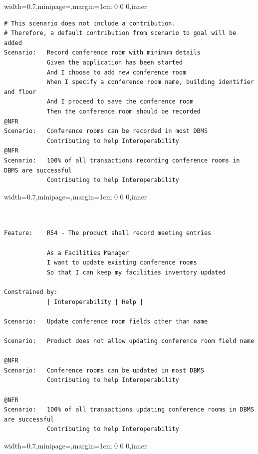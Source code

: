 \documentclass[dissertation,final]{softeng}
\newenvironment{featurecode}[1]
{ \lrbox\featurebox \begin{adjustbox}{width=#1\textwidth,minipage=\textwidth,margin=1cm 0 0 0,inner} }
{ \end{adjustbox}\endlrbox}
\newenvironment{featurelist}[2]
{
\newcommand{\setcaption}{\caption{#1}}
\newcommand{\setlabel}{\label{#2}}
}
{\begin{listing}[h!]\centering\usebox\featurebox\setcaption\setlabel\end{listing}}
\begin{document}
\begin{appendices}
\begin{featurelist}{R53 -- The product shall store new conference rooms}{lst:feature_r53}
\begin{featurecode}{0.7}
\begin{verbatim}
# This scenario does not include a contribution.
# Therefore, a default contribution from scenario to goal will be added
Scenario:   Record conference room with minimum details
            Given the application has been started
            And I choose to add new conference room
            When I specify a conference room name, building identifier and floor
            And I proceed to save the conference room
            Then the conference room should be recorded
@NFR	
Scenario:   Conference rooms can be recorded in most DBMS
            Contributing to help Interoperability
@NFR
Scenario:   100% of all transactions recording conference rooms in DBMS are successful
            Contributing to help Interoperability
\end{verbatim}
\end{featurecode}
\end{featurelist}

\begin{featurelist}{R54 -- The product shall record meeting entries}{lst:feature_r54}
\begin{featurecode}{0.7}
\begin{verbatim}


Feature:    R54 - The product shall record meeting entries

            As a Facilities Manager
            I want to update existing conference rooms
            So that I can keep my facilities inventory updated
	
Constrained by:
            | Interoperability | Help |

Scenario:   Update conference room fields other than name

Scenario:   Product does not allow updating conference room field name

@NFR	
Scenario:   Conference rooms can be updated in most DBMS
            Contributing to help Interoperability

@NFR
Scenario:   100% of all transactions updating conference rooms in DBMS are successful
            Contributing to help Interoperability	
\end{verbatim}
\end{featurecode}
\end{featurelist}
\clearpage

\begin{featurelist}{R55 -- The product will be able to delete conference rooms}{lst:feature_r55}
\begin{featurecode}{0.7}
\begin{verbatim}



\end{verbatim}
\end{featurecode}
\end{featurelist}
\end{appendices}
\end{document}
